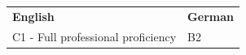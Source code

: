 
\begin{tabularx}{\textwidth}{
>{\raggedright\arraybackslash}X
>{\raggedright\arraybackslash}X
}

\textbf{English} &
\textbf{German} \\

C1 - Full professional proficiency &
B2\\

\end{tabularx}

\vspace{-2mm}

